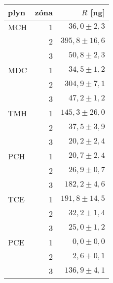 \begin{tabular}{lrr}
\toprule
plyn & zóna & $R$ [\si{ng}]               \\
\midrule
MCH & 1 & $  36,0\pm2,3$\\
    & 2 & $395,8\pm16,6$\\
    & 3 & $  50,8\pm2,3$\\
MDC & 1 & $  34,5\pm1,2$\\
    & 2 & $ 304,9\pm7,1$\\
    & 3 & $  47,2\pm1,2$\\
TMH & 1 & $145,3\pm26,0$\\
    & 2 & $  37,5\pm3,9$\\
    & 3 & $  20,2\pm2,4$\\
PCH & 1 & $  20,7\pm2,4$\\
    & 2 & $  26,9\pm0,7$\\
    & 3 & $ 182,2\pm4,6$\\
TCE & 1 & $191,8\pm14,5$\\
    & 2 & $  32,2\pm1,4$\\
    & 3 & $  25,0\pm1,2$\\
PCE & 1 & $     0,0\pm0,0$\\
    & 2 & $   2,6\pm0,1$\\
    & 3 & $ 136,9\pm4,1$\\
\bottomrule
\end{tabular}
